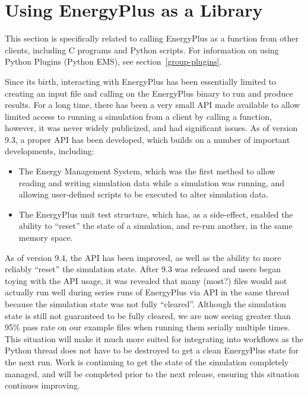
\section{Using EnergyPlus as a Library}\label{sec:api-usage}

This section is specifically related to calling EnergyPlus as a function from other clients, including C programs and Python scripts.
For information on using Python Plugins (Python EMS), see section~\ref{group-plugins}.

Since its birth, interacting with EnergyPlus has been essentially limited to creating an input file and calling on the EnergyPlus binary to run and produce results.
For a long time, there has been a very small API made available to allow limited access to running a simulation from a client by calling a function, however, it was never widely publicized, and had significant issues.
As of version 9.3, a proper API has been developed, which builds on a number of important developments, including:

\begin{itemize}
 \item The Energy Management System, which was the first method to allow reading and writing simulation data while a simulation was running, and allowing user-defined scripts to be executed to alter simulation data.
 \item The EnergyPlus unit test structure, which has, as a side-effect, enabled the ability to ``reset'' the state of a simulation, and re-run another, in the same memory space.
\end{itemize}

As of version 9.4, the API has been improved, as well as the ability to more reliably ``reset'' the simulation state.
After 9.3 was released and users began toying with the API usage, it was revealed that many (most?) files would not actually run well during series runs of EnergyPlus via API in the same thread because the simulation state was not fully ``cleared''.
Although the simulation state is still not guaranteed to be fully cleared, we are now seeing greater than 95\% pass rate on our example files when running them serially multiple times.
This situation will make it much more suited for integrating into workflows as the Python thread does not have to be destroyed to get a clean EnergyPlus state for the next run.
Work is continuing to get the state of the simulation completely managed, and will be completed prior to the next release, ensuring this situation continues improving.

